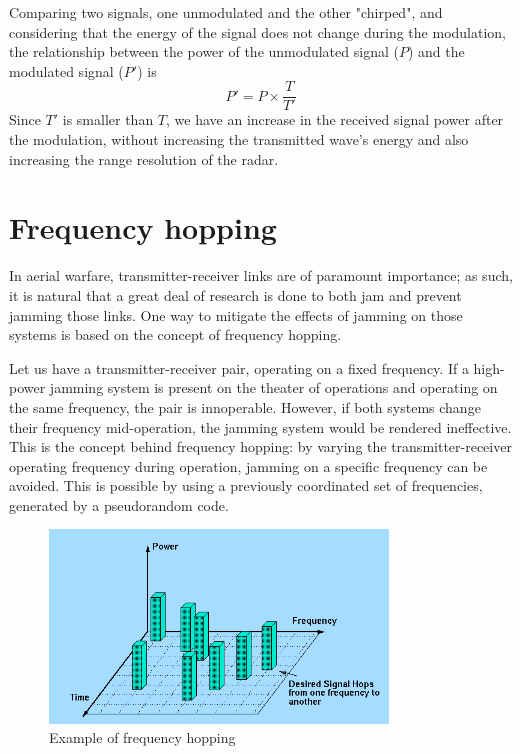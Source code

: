 \documentclass[english,purist]{ist-report}
\begin{document}
Comparing two signals, one unmodulated and the other "chirped", and considering that the energy of the signal does not change during the modulation, the relationship between the power of the unmodulated signal ($P$) and the modulated signal ($P'$) is
$$
P' = P \times \frac{T}{T'}
$$
Since $T'$ is smaller than $T$, we have an increase in the received signal power after the modulation, without increasing the transmitted wave's energy and also increasing the range resolution of the radar.


\section{Frequency hopping}

In aerial warfare, transmitter-receiver links are of paramount importance; as such, it is natural that a great deal of research is done to both jam and prevent jamming those links. One way to mitigate the effects of jamming on those systems is based on the concept of frequency hopping.

Let us have a transmitter-receiver pair, operating on a fixed frequency. If a high-power jamming system is present on the theater of operations and operating on the same frequency, the pair is innoperable. However, if both systems change their frequency mid-operation, the jamming system would be rendered ineffective. This is the concept behind frequency hopping: by varying the transmitter-receiver operating frequency during operation, jamming on a specific frequency can be avoided. This is possible by using a previously coordinated set of frequencies, generated by a pseudorandom code.

\begin{figure}[ht]
\centering
\includegraphics[width=90mm]{frequency_hopping.PNG}
\caption{Example of frequency hopping}
\label{frequency_hopping}
\end{figure} 
\end{document}
